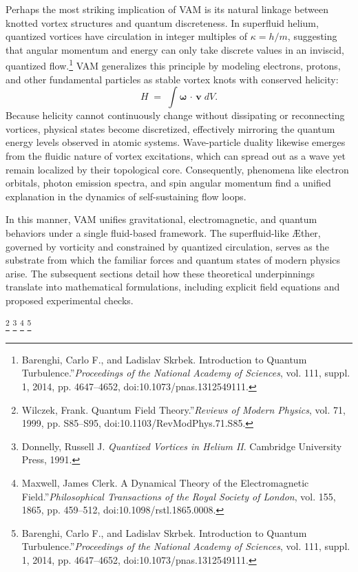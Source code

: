Perhaps the most striking implication of VAM is its natural linkage between knotted vortex structures and quantum discreteness. In superfluid helium, quantized vortices have circulation in integer multiples of \(\kappa = h / m\), suggesting that angular momentum and energy can only take discrete values in an inviscid, quantized flow.\footnote{Barenghi, Carlo F., and Ladislav Skrbek. \grqq Introduction to Quantum Turbulence.\textquotedblright \textit{Proceedings of the National Academy of Sciences}, vol. 111, suppl. 1, 2014, pp. 4647–4652, doi:10.1073/pnas.1312549111.} VAM generalizes this principle by modeling electrons, protons, and other fundamental particles as stable vortex knots with conserved helicity:
\[
    H \;=\; \int \boldsymbol{\omega} \,\cdot\, \mathbf{v}\; dV.
\]
Because helicity cannot continuously change without dissipating or reconnecting vortices, physical states become discretized, effectively mirroring the quantum energy levels observed in atomic systems. Wave-particle duality likewise emerges from the fluidic nature of vortex excitations, which can spread out as a wave yet remain localized by their topological core. Consequently, phenomena like electron orbitals, photon emission spectra, and spin angular momentum find a unified explanation in the dynamics of self-sustaining flow loops.

In this manner, VAM unifies gravitational, electromagnetic, and quantum behaviors under a single fluid-based framework. The superfluid-like Æther, governed by vorticity and constrained by quantized circulation, serves as the substrate from which the familiar forces and quantum states of modern physics arise. The subsequent sections detail how these theoretical underpinnings translate into mathematical formulations, including explicit field equations and proposed experimental checks.

\footnote{Wilczek, Frank. \grqq Quantum Field Theory.\textquotedblright \textit{Reviews of Modern Physics}, vol. 71, 1999, pp. S85–S95, doi:10.1103/RevModPhys.71.S85.}
\footnote{Donnelly, Russell J. \textit{Quantized Vortices in Helium II}. Cambridge University Press, 1991.}
\footnote{Maxwell, James Clerk. \grqq A Dynamical Theory of the Electromagnetic Field.\textquotedblright \textit{Philosophical Transactions of the Royal Society of London}, vol. 155, 1865, pp. 459–512, doi:10.1098/rstl.1865.0008.}
\footnote{Barenghi, Carlo F., and Ladislav Skrbek. \grqq Introduction to Quantum Turbulence.\textquotedblright \textit{Proceedings of the National Academy of Sciences}, vol. 111, suppl. 1, 2014, pp. 4647–4652, doi:10.1073/pnas.1312549111.}